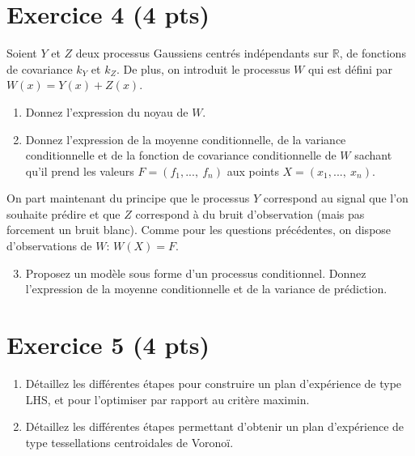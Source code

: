 \documentclass{article}
\begin{document}
\section*{Exercice 4 (4 pts)}
Soient $Y$ et $Z$ deux processus Gaussiens centrés indépendants sur $\mathds{R}$, de fonctions de covariance $k_Y$ et $k_Z$. De plus, on introduit le processus $W$ qui est défini par $W(x) = Y(x) + Z(x)$.
\begin{enumerate}
	\item Donnez l'expression du noyau de $W$.
	\item Donnez l'expression de la moyenne conditionnelle, de la variance conditionnelle et de la fonction de covariance conditionnelle de $W$ sachant qu'il prend les valeurs $F=(f_1,...,\ f_n)$ aux points $X=(x_1,...,\ x_n)$.
\end{enumerate}
On part maintenant du principe que le processus $Y$ correspond au signal que l'on souhaite prédire et que $Z$ correspond à du bruit d'observation (mais pas forcement un bruit blanc). Comme pour les questions précédentes, on dispose d'observations de $W$: $W(X)=F$. 
\begin{enumerate}
	\setcounter{enumi}{2}
	\item Proposez un modèle sous forme d'un processus conditionnel. Donnez l'expression de la moyenne conditionnelle et de la variance de prédiction.
\end{enumerate}

\section*{Exercice 5 (4 pts)}
\begin{enumerate}
	\item Détaillez les différentes étapes pour construire un plan d'expérience de type LHS, et pour l'optimiser par rapport au critère maximin.
	\item Détaillez les différentes étapes permettant d'obtenir un plan d'expérience de type tessellations centroidales de Voronoï.
\end{enumerate}
\end{document}
